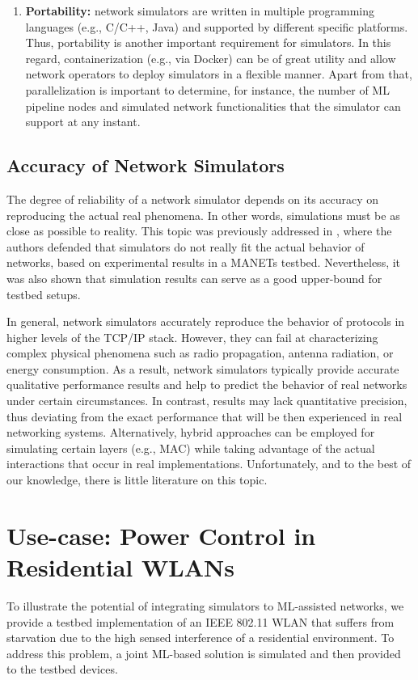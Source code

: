 \documentclass[journal]{IEEEtran}
\begin{document}
\begin{enumerate}
        \item \textbf{Portability:} network simulators are written in multiple programming languages (e.g., C/C++, Java) and supported by different specific platforms. Thus, portability is another important requirement for simulators. In this regard, containerization (e.g., via Docker) can be of great utility and allow network operators to deploy simulators in a flexible manner. Apart from that, parallelization is important to determine, for instance, the number of ML pipeline nodes and simulated network functionalities that the simulator can support at any instant.
    \end{enumerate}

	\subsection{Accuracy of Network Simulators}
	The degree of reliability of a network simulator depends on its accuracy on reproducing the actual real phenomena. In other words, simulations must be as close as possible to reality. This topic was previously addressed in \cite{accuracy_manet}, where the authors defended that simulators do not really fit the actual behavior of networks, based on experimental results in a MANETs testbed. Nevertheless, it was also shown that simulation results can serve as a good upper-bound for testbed setups.
		
	In general, network simulators accurately reproduce the behavior of protocols in higher levels of the TCP/IP stack. However, they can fail at characterizing complex physical phenomena such as radio propagation, antenna radiation, or energy consumption. As a result, network simulators typically provide accurate qualitative performance results and help to predict the behavior of real networks under certain circumstances. In contrast, results may lack quantitative precision, thus deviating from the exact performance that will be then experienced in real networking systems. Alternatively, hybrid approaches can be employed for simulating certain layers (e.g., MAC) while taking advantage of the actual interactions that occur in real implementations. Unfortunately, and to the best of our knowledge, there is little literature on this topic. 
		
	\section{Use-case: Power Control in Residential WLANs}	
	To illustrate the potential of integrating simulators to ML-assisted networks, we provide a testbed implementation of an IEEE 802.11 WLAN that suffers from starvation due to the high sensed interference of a residential environment. To address this problem, a joint ML-based solution is simulated and then provided to the testbed devices.
	
\end{document}
